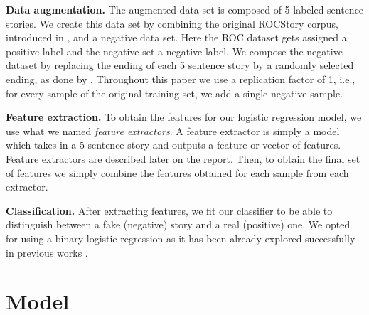 \documentclass{article}
\begin{document}
\textbf{Data augmentation.} The augmented data set is composed of 5 labeled
sentence stories. We create this data set by combining the original ROCStory
corpus, introduced in \cite{ROCstories}, and a negative data set. Here the ROC
dataset gets assigned a positive label and the negative set a negative label. We
compose the negative dataset by replacing the ending of each 5 sentence story by
a randomly selected ending, as done by \cite{LSTMClassifier}. Throughout this paper we use a replication factor of 1,
i.e., for every sample of the original training set, we add a single negative
sample.

\textbf{Feature extraction.} To obtain the features for our logistic regression
model, we use what we named {\it feature extractors}. A feature extractor is
simply a model which takes in a 5 sentence story and outputs a feature or vector
of features. Feature extractors are described later on the report.  Then, to
obtain the final set of features we simply combine the features obtained for
each sample from each extractor.

\textbf{Classification.} After extracting features, we fit our classifier to be
able to distinguish between a fake (negative) story and a real (positive) one.
We opted for using a binary logistic regression as it has been already explored
successfully in previous works \cite{UWNLP,COGCOMP}.


\section{Model}
\end{document}

